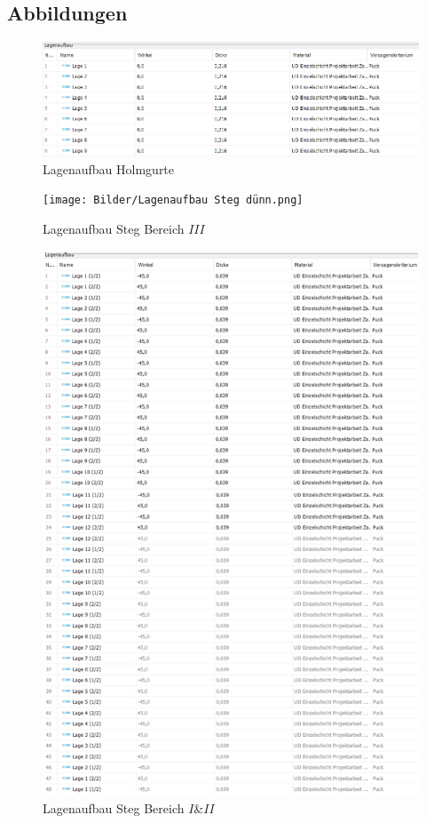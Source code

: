 \subsection{Abbildungen}
\begin{figure}[h]
	\includegraphics[width=1.0\textwidth]{Bilder/Lagenaufbau Holmgurte.png}
	\caption{Lagenaufbau Holmgurte}
	\label{fig:Lagenaufbau Holmgurte}
\end{figure}
\begin{figure}
	\texttt{[image: Bilder/Lagenaufbau Steg dünn.png]}
	\caption{Lagenaufbau Steg Bereich $III$}
	\label{fig:Lagenaufbau Steg dünn}
\end{figure}
\begin{figure}
	\includegraphics[width=1.0\textwidth]{Bilder/Lagenaufbau Steg dick.png}
	\caption{Lagenaufbau Steg Bereich $I$\&$II$}
	\label{fig:Lagenaufbau Steg dick}
\end{figure}
